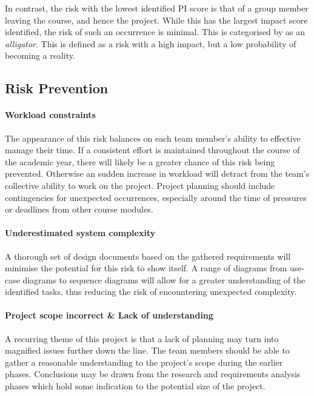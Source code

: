 In contrast, the risk with the lowest identified PI score is that of a group member leaving the course, and hence the project. While this has the largest impact score identified, the risk of such an occurrence is minimal. This is categorised by \citet{stoeller03} as an \emph{alligator}. This is defined as a risk with a high impact, but a low probability of becoming a reality.

\subsection{Risk Prevention}
\paragraph{Workload constraints}
The appearance of this risk balances on each team member's ability to effective manage their time. If a consistent effort is maintained throughout the course of the academic year, there will likely be a greater chance of this risk being prevented. Otherwise an sudden increase in workload will detract from the team's collective ability to work on the project. Project planning should include contingencies for unexpected occurrences, especially around the time of pressures or deadlines from other course modules.

\paragraph{Underestimated system complexity}
A thorough set of design documents based on the gathered requirements will minimise the potential for this risk to show itself. A range of diagrams from use-case diagrams to sequence diagrams will allow for a greater understanding of the identified tasks, thus reducing the risk of encountering unexpected complexity.

\paragraph{Project scope incorrect \& Lack of understanding}
A recurring theme of this project is that a lack of planning may turn into magnified issues further down the line. The team members should be able to gather a reasonable understanding to the project's scope during the earlier phases. Conclusions may be drawn from the research and requirements analysis phases which hold some indication to the potential size of the project.

